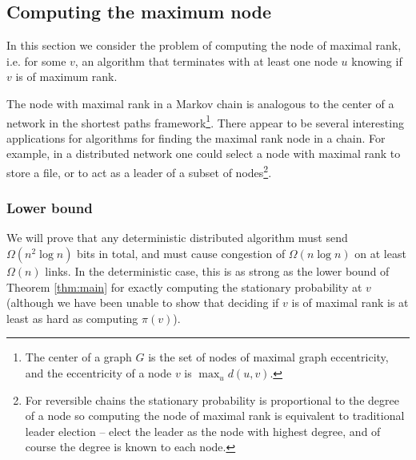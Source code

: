 \documentclass[twocolumn]{article}
\begin{document}
\subsection{Computing the maximum node}

In this section we consider the problem of computing the node of maximal rank, i.e. for some $v$, an algorithm that terminates with at least one node $u$ knowing if $v$ is of maximum rank.



The node with maximal rank in a Markov chain is analogous to the center of a network in the shortest paths framework\footnote{The center of a graph $G$ is the set of nodes of maximal graph eccentricity, and the eccentricity of a node $v$ is $\max_u d(u,v)$.}. There appear to be several interesting applications for algorithms for finding the maximal rank node in a chain. For example, in a distributed network one could select a node with maximal rank to store a file, or to act as a leader of a subset of nodes\footnote{For reversible chains the stationary probability is proportional to the degree of a node so computing the node of maximal rank is equivalent to traditional leader election -- elect the leader as the node with highest degree, and of course the degree is known to each node.}.

\subsubsection{Lower bound}
We will prove that any deterministic distributed algorithm must send $\Omega(n^2 \log n)$ bits in total, and must cause congestion of $\Omega(n \log n)$ on at least $\Omega(n)$ links. In the deterministic case, this is as strong as the lower bound of Theorem \ref{thm:main} for exactly computing the stationary probability at $v$ (although we have been unable to show that deciding if $v$ is of maximal rank is at least as hard as computing $\pi(v)$).
\end{document}

